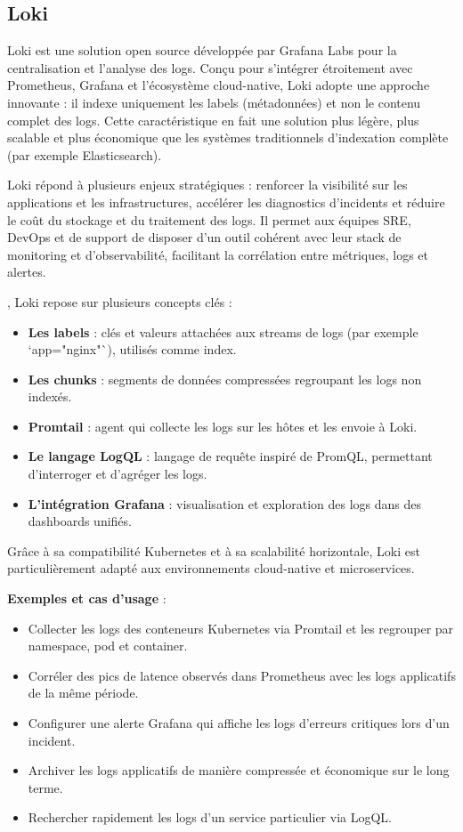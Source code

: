 \subsection{Loki}

Loki est une solution open source développée par Grafana Labs pour la centralisation et l’analyse des logs. Conçu pour s’intégrer étroitement avec Prometheus, Grafana et l’écosystème cloud-native, Loki adopte une approche innovante  : il indexe uniquement les labels (métadonnées) et non le contenu complet des logs. Cette caractéristique en fait une solution plus légère, plus scalable et plus économique que les systèmes traditionnels d’indexation complète (par exemple Elasticsearch).

 Loki répond à plusieurs enjeux stratégiques  : renforcer la visibilité sur les applications et les infrastructures, accélérer les diagnostics d’incidents et réduire le coût du stockage et du traitement des logs. Il permet aux équipes SRE, DevOps et de support de disposer d’un outil cohérent avec leur stack de monitoring et d’observabilité, facilitant la corrélation entre métriques, logs et alertes.

, Loki repose sur plusieurs concepts clés  :
\begin{itemize}
	\item \textbf{Les labels}  : clés et valeurs attachées aux streams de logs (par exemple `app="nginx"`), utilisés comme index.
	\item \textbf{Les chunks}  : segments de données compressées regroupant les logs non indexés.
	\item \textbf{Promtail}  : agent qui collecte les logs sur les hôtes et les envoie à Loki.
	\item \textbf{Le langage LogQL}  : langage de requête inspiré de PromQL, permettant d’interroger et d’agréger les logs.
	\item \textbf{L’intégration Grafana}  : visualisation et exploration des logs dans des dashboards unifiés.
\end{itemize}

Grâce à sa compatibilité Kubernetes et à sa scalabilité horizontale, Loki est particulièrement adapté aux environnements cloud-native et microservices.

\textbf{Exemples et cas d’usage} :
\begin{itemize}
	\item Collecter les logs des conteneurs Kubernetes via Promtail et les regrouper par namespace, pod et container.
	\item Corréler des pics de latence observés dans Prometheus avec les logs applicatifs de la même période.
	\item Configurer une alerte Grafana qui affiche les logs d’erreurs critiques lors d’un incident.
	\item Archiver les logs applicatifs de manière compressée et économique sur le long terme.
	\item Rechercher rapidement les logs d’un service particulier via LogQL.
\end{itemize}

